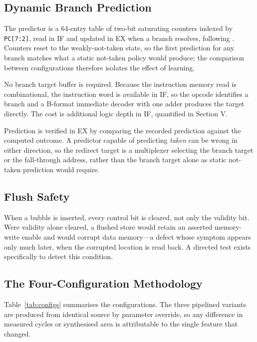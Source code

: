 \documentclass[conference]{IEEEtran}
\begin{document}
\subsection{Dynamic Branch Prediction}

The predictor is a 64-entry table of two-bit saturating counters indexed by
\texttt{PC[7:2]}, read in IF and updated in EX when a branch resolves,
following \cite{smith1981}. Counters reset to the weakly-not-taken state,
so the first prediction for any branch matches what a static not-taken
policy would produce; the comparison between configurations therefore
isolates the effect of learning.

No branch target buffer is required. Because the instruction memory read is
combinational, the instruction word is available in IF, so the opcode
identifies a branch and a B-format immediate decoder with one adder
produces the target directly. The cost is additional logic depth in IF,
quantified in Section V.

Prediction is verified in EX by comparing the recorded prediction against
the computed outcome. A predictor capable of predicting \emph{taken} can be
wrong in either direction, so the redirect target is a multiplexer
selecting the branch target or the fall-through address, rather than the
branch target alone as static not-taken prediction would require.

\subsection{Flush Safety}

When a bubble is inserted, every control bit is cleared, not only the
validity bit. Were validity alone cleared, a flushed store would retain an
asserted memory-write enable and would corrupt data memory---a defect
whose symptom appears only much later, when the corrupted location is read
back. A directed test exists specifically to detect this condition.

\subsection{The Four-Configuration Methodology}

Table~\ref{tab:configs} summarises the configurations. The three pipelined
variants are produced from identical source by parameter override, so any
difference in measured cycles or synthesised area is attributable to the
single feature that changed.
\end{document}
